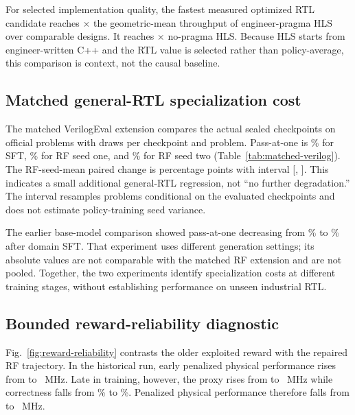 For selected implementation quality, the fastest measured optimized RTL
candidate reaches $\times$ the geometric-mean
throughput of engineer-pragma HLS over  comparable
designs.  It reaches $\times$ no-pragma HLS.  Because HLS
starts from engineer-written C++ and the RTL value is selected rather than
policy-average, this comparison is context, not the causal baseline.

\subsection{Matched general-RTL specialization cost}



The matched VerilogEval extension compares the actual sealed checkpoints on
 official problems with
 draws per checkpoint and problem.  Pass-at-one
is \% for SFT,
\% for RF seed one, and
\% for RF seed two
(Table~\ref{tab:matched-verilog}).  The RF-seed-mean paired change is
 percentage points with interval
[, ].  This indicates
a small additional general-RTL regression, not ``no further degradation.''
The interval resamples problems conditional on the evaluated checkpoints and
does not estimate policy-training seed variance.

The earlier base-model comparison showed pass-at-one decreasing from
\% to \% after domain SFT.
That experiment uses different generation settings; its absolute values are
not comparable with the matched RF extension and are not pooled.  Together,
the two experiments identify specialization costs at different training stages,
without establishing performance on unseen industrial RTL.

\subsection{Bounded reward-reliability diagnostic}
\label{sec:trajectory}

Fig.~\ref{fig:reward-reliability} contrasts the older exploited reward with
the repaired RF trajectory.  In the historical run, early penalized physical
performance rises from  to
~MHz.  Late in training, however, the proxy
rises from  to
~MHz while correctness falls from
\% to
\%.  Penalized physical performance
therefore falls from  to
~MHz.


